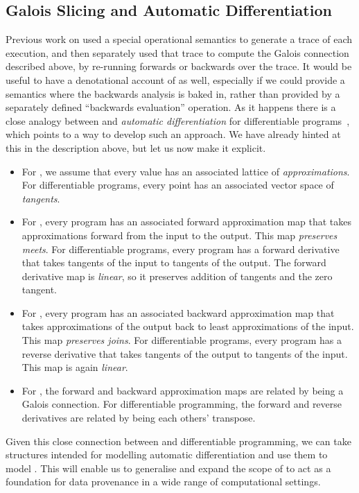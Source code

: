 \subsection{Galois Slicing and Automatic Differentiation}

Previous work on \GPS used a special operational semantics to generate a trace of each execution, and then separately used that trace to compute the Galois connection described above, by re-running forwards or backwards over the trace. It would be useful to have a denotational account of \GPS as well, especially if we could provide a semantics where the backwards analysis is baked in, rather than provided by a separately defined ``backwards evaluation'' operation. As it happens there is a close analogy between \GPS and \emph{automatic differentiation} for differentiable programs~\cite{siskind08,elliott18,vakar22}, which points to a way to develop such an approach. We have already hinted at this in the description above, but let us now make it explicit.

\begin{itemize}[leftmargin=\enummargin]
\item For \GPS, we assume that every value has an associated lattice of {\em approximations}. For differentiable programs, every point has an associated vector space of {\em tangents}.
\item For \GPS, every program has an associated forward approximation map that takes approximations forward from the input to the output. This map {\em preserves meets}. For differentiable programs, every program has a forward derivative that takes tangents of the input to tangents of the output. The forward derivative map is {\em linear}, so it preserves addition of tangents and the zero tangent.
\item For \GPS, every program has an associated backward approximation map that takes approximations of the output back to least approximations of the input. This map {\em preserves joins}. For differentiable programs, every program has a reverse derivative that takes tangents of the output to tangents of the input. This map is again {\em linear}.
\item For \GPS, the forward and backward approximation maps are related by being a Galois connection. For differentiable programming, the forward and reverse derivatives are related by being each others' transpose.
\end{itemize}

Given this close connection between \GPS and differentiable programming, we can take structures intended for modelling automatic differentiation and use them to model \GPS. This will enable us to generalise and expand the scope of \GPS to act as a foundation for data provenance in a wide range of computational settings.

